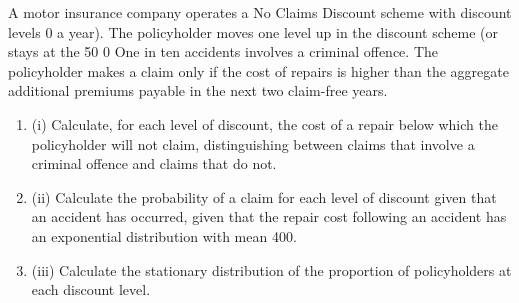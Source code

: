\documentclass[a4paper,12pt]{article}
\begin{document}

A motor insurance company operates a No Claims Discount scheme with discount
levels 0%
a year). The policyholder moves one level up in the discount scheme (or stays at the 50%
0%
One in ten accidents involves a criminal offence. The policyholder makes a claim only if the cost of repairs is higher than the aggregate additional premiums payable in
the next two claim-free years.
\begin{enumerate}
\item (i) 
Calculate, for each level of discount, the cost of a repair below which the policyholder will not claim, distinguishing between claims that involve a
criminal offence and claims that do not.

\item (ii)  Calculate the probability of a claim for each level of discount given that an accident has occurred, given that the repair cost following an accident has an
exponential distribution with mean 400.

\item (iii)  Calculate the stationary distribution of the proportion of policyholders at each discount level.

\end{enumerate}

\end{document}
